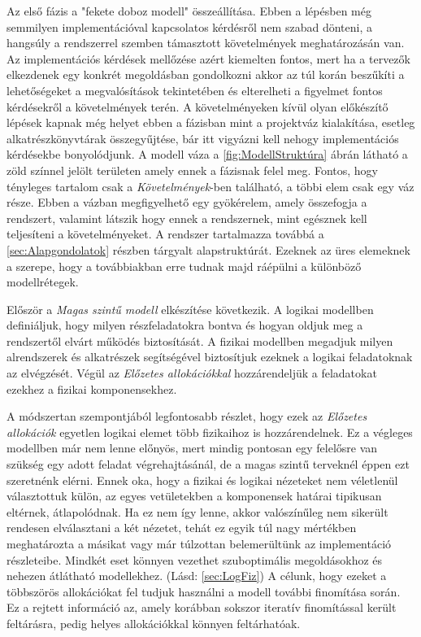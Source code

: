         Az első fázis a "fekete doboz modell" összeállítása. Ebben a lépésben még semmilyen implementációval kapcsolatos kérdésről nem szabad dönteni, a hangsúly a rendszerrel szemben támasztott követelmények meghatározásán van.
        Az implementációs kérdések mellőzése azért kiemelten fontos, mert ha a tervezők elkezdenek egy konkrét megoldásban gondolkozni akkor az túl korán beszűkíti a lehetőségeket a megvalósítások tekintetében és elterelheti a figyelmet fontos kérdésekről a követelmények terén.
        A követelményeken kívül olyan előkészítő lépések kapnak még helyet ebben a fázisban mint a projektváz kialakítása, esetleg alkatrészkönyvtárak összegyűjtése, bár itt vigyázni kell nehogy implementációs kérdésekbe bonyolódjunk.
        A modell váza a \ref{fig:ModellStruktúra} ábrán látható a zöld színnel jelölt területen amely ennek a fázisnak felel meg.
        Fontos, hogy tényleges tartalom csak a \emph{Követelmények}-ben található, a többi elem csak egy váz része. Ebben a vázban megfigyelhető egy gyökérelem, amely összefogja a rendszert, valamint látszik hogy ennek a rendszernek, mint egésznek kell teljesíteni a követelményeket.
        A rendszer tartalmazza továbbá a \ref{sec:Alapgondolatok} részben tárgyalt alapstruktúrát.
        Ezeknek az üres elemeknek a szerepe, hogy a továbbiakban erre tudnak majd ráépülni a különböző modellrétegek.

        Először a \emph{Magas szintű modell} elkészítése következik. A logikai modellben definiáljuk, hogy milyen részfeladatokra bontva és hogyan oldjuk meg a rendszertől elvárt működés biztosítását.
        A fizikai modellben megadjuk milyen alrendszerek és alkatrészek segítségével biztosítjuk ezeknek a logikai feladatoknak az elvégzését.
        Végül az \emph{Előzetes allokációkkal} hozzárendeljük a feladatokat ezekhez a fizikai komponensekhez.
        
        A módszertan szempontjából legfontosabb részlet, hogy ezek az \emph{Előzetes allokációk} egyetlen logikai elemet több fizikaihoz is hozzárendelnek. Ez a végleges modellben már nem lenne előnyös, mert mindig pontosan egy felelősre van szükség egy adott feladat végrehajtásánál, de a magas szintű terveknél éppen ezt szeretnénk elérni.
        Ennek oka, hogy a fizikai és logikai nézeteket nem véletlenül választottuk külön, az egyes vetületekben a komponensek határai tipikusan eltérnek, átlapolódnak.
        Ha ez nem így lenne, akkor valószínűleg nem sikerült rendesen elválasztani a két nézetet, tehát ez egyik túl nagy mértékben meghatározta a másikat vagy már túlzottan belemerültünk az implementáció részleteibe. Mindkét eset könnyen vezethet szuboptimális megoldásokhoz és nehezen átlátható modellekhez. (Lásd: \ref{sec:LogFiz})
        A célunk, hogy ezeket a többszörös allokációkat fel tudjuk használni a modell további finomítása során. Ez a rejtett információ az, amely korábban sokszor iteratív finomítással került feltárásra, pedig helyes allokációkkal könnyen feltárhatóak.

